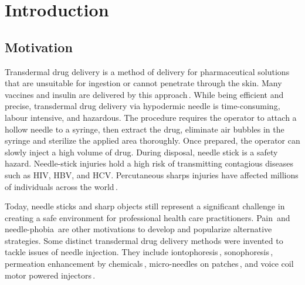 \chapter{Introduction}      \label{Chapter:intro}


\section{Motivation}        \label{Chapter:intro/motivation}

        
    Transdermal drug delivery is a method of delivery for pharmaceutical solutions that are unsuitable for ingestion or cannot penetrate through the skin. Many vaccines and insulin are delivered by this approach\,\cite{sadrzadeh2007}. While being efficient and precise, transdermal drug delivery via hypodermic needle is time-consuming, labour intensive, and hazardous. The procedure requires the operator to attach a hollow needle to a syringe, then extract the drug, eliminate air bubbles in the syringe and sterilize the applied area thoroughly. Once prepared, the operator can slowly inject a high volume of drug. During disposal, needle stick is a safety hazard. Needle-stick injuries hold a high risk of transmitting contagious diseases such as HIV, HBV, and HCV. Percutaneous sharps injuries have affected millions of individuals across the world\,\cite{pruss2005}. 
    
    Today, needle sticks and sharp objects still represent a significant challenge in creating a safe environment for professional health care practitioners. Pain\,\cite{schneider1994} and needle-phobia\,\cite{hamilton2005,Nir2003} are other motivations to develop and popularize alternative strategies. Some distinct transdermal drug delivery methods were invented to tackle issues of needle injection. They include iontophoresis\,\cite{dhote2012}, sonophoresis\,\cite{bommanan1992}, permeation enhancement by chemicals\,\cite{karande2006}, micro-needles on patches\,\cite{cormier2004}, and voice coil motor powered injectors\,\cite{taberner2006}. 
    
